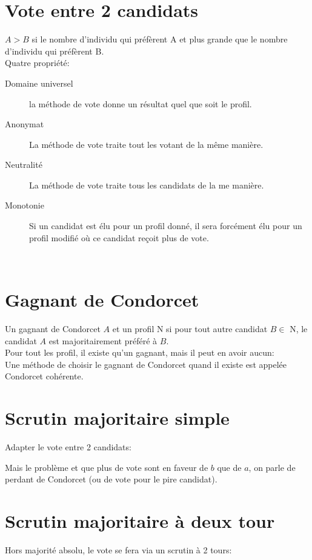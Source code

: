 \section{Vote entre 2 candidats}
$A > B$ si le nombre d'individu qui préfèrent A et plus grande que le nombre d'individu qui préfèrent B.\\

Quatre propriété:
\begin{description}
\item[Domaine universel] la méthode de vote donne un résultat quel que soit le profil.
\item[Anonymat] La méthode de vote traite tout les votant de la même manière.
\item[Neutralité] La méthode de vote traite tous les candidats de la me manière.
\item[Monotonie] Si un candidat est élu pour un profil donné, il sera forcément élu pour un profil modifié où ce candidat reçoit plus de vote.
\end{description}
\ \\

\section{Gagnant de Condorcet}
Un gagnant de Condorcet $A$ et un profil N si pour tout autre candidat $B \in$ N, le candidat $A$ est majoritairement préféré à $B$.\\


Pour tout les profil, il existe qu'un gagnant, mais il peut en avoir aucun:\\


Une méthode de choisir le gagnant de Condorcet quand il existe est appelée Condorcet cohérente.

\section{Scrutin majoritaire simple}
Adapter le vote entre 2 candidats:


Mais le problème et que plus de vote sont en faveur de $b$ que de $a$, on parle de perdant de Condorcet (ou de vote pour le pire candidat).\\

\section{Scrutin majoritaire à deux tour}
Hors majorité absolu, le vote se fera via un scrutin à 2 tours:

